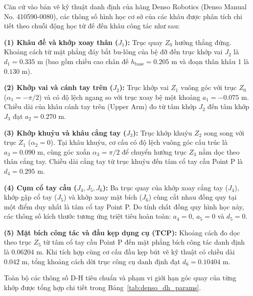 Căn cứ vào bản vẽ kỹ thuật danh định của hãng Denso Robotics (Denso Manual No. 410590-0080), các thông số hình học cơ sở của các khâu được phân tích chi tiết theo chuỗi động học từ đế đến khâu công tác như sau:

\textbf{(1) Khâu đế và khớp xoay thân ($J_1$):} Trục quay $Z_0$ hướng thẳng đứng. Khoảng cách từ mặt phẳng đáy bắt bu-lông của bệ đỡ đến trục khớp vai $J_2$ là $d_1 = 0.335\text{ m}$ (bao gồm chiều cao chân đế $h_{\text{base}} = 0.205\text{ m}$ và đoạn thân khâu 1 là $0.130\text{ m}$).

\textbf{(2) Khớp vai và cánh tay trên ($J_2$):} Trục khớp vai $Z_1$ vuông góc với trục $Z_0$ ($\alpha_1 = -\pi/2$) và có độ lệch ngang so với trục xoay bệ một khoảng $a_1 = -0.075\text{ m}$. Chiều dài của khâu cánh tay trên (Upper Arm) đo từ tâm khớp $J_2$ đến tâm khớp $J_3$ đạt $a_2 = 0.270\text{ m}$.

\textbf{(3) Khớp khuỷu và khâu cẳng tay ($J_3$):} Trục khớp khuỷu $Z_2$ song song với trục $Z_1$ ($\alpha_2 = 0$). Tại khâu khuỷu, cơ cấu có độ lệch vuông góc cấu trúc là $a_3 = 0.090\text{ m}$, cùng góc xoắn $\alpha_3 = \pi/2$ để chuyển hướng trục $Z_3$ nằm dọc theo thân cẳng tay. Chiều dài cẳng tay từ trục khuỷu đến tâm cổ tay cầu Point P là $d_4 = 0.295\text{ m}$.

\textbf{(4) Cụm cổ tay cầu ($J_4, J_5, J_6$):} Ba trục quay của khớp xoay cẳng tay ($J_4$), khớp gập cổ tay ($J_5$) và khớp xoay mặt bích ($J_6$) cùng cắt nhau đồng quy tại một điểm duy nhất là tâm cổ tay Point P. Do tính chất đồng quy hình học này, các thông số kích thước tương ứng triệt tiêu hoàn toàn: $a_4 = 0$, $a_5 = 0$ và $d_5 = 0$.

\textbf{(5) Mặt bích công tác và đầu kẹp dụng cụ (TCP):} Khoảng cách đo dọc theo trục $Z_5$ từ tâm cổ tay cầu Point P đến mặt phẳng bích công tác danh định là $0.06204\text{ m}$. Khi tích hợp cùng cơ cấu đầu kẹp bút vẽ kỹ thuật có chiều dài $0.042\text{ m}$, tổng khoảng cách dời trục công cụ danh định đạt $d_6 = 0.10404\text{ m}$.

Toàn bộ các thông số D-H tiêu chuẩn và phạm vi giới hạn góc quay của từng khớp được tổng hợp chi tiết trong Bảng~\ref{tab:denso_dh_params}.

